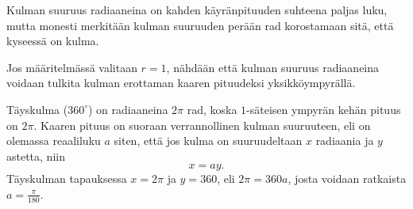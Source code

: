 Kulman suuruus radiaaneina on kahden käyränpituuden suhteena paljas luku, mutta monesti merkitään kulman suuruuden perään rad korostamaan sitä, että kyseessä on kulma.

Jos määritelmässä valitaan $r = 1$, nähdään että kulman suuruus radiaaneina voidaan tulkita kulman erottaman kaaren pituudeksi yksikköympyrällä.

Täyskulma ($360^\circ$) on radiaaneina $2\pi$ rad, koska $1$-säteisen ympyrän kehän pituus on $2\pi$. Kaaren pituus on suoraan verrannollinen kulman suuruuteen, eli on olemassa reaaliluku $a$ siten, että jos kulma on suuruudeltaan $x$ radiaania ja $y$ astetta, niin
\[x = a y.\]
Täyskulman tapauksessa $x = 2\pi$ ja $y = 360$, eli $2\pi = 360 a$, josta voidaan ratkaista $a = \frac{\pi}{180}$.

